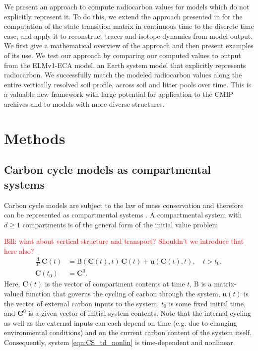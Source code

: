 \documentclass[11pt,a4paper]{article}
\newcommand{\red}[1]{\textcolor{red}{#1}}
\renewcommand{\vec}[1]{\mathbf{#1}}
\newcommand{\tens}[1]{\mathrm{#1}}
\newcommand{\deriv}[1]{\frac{\mathrm{d}}{\mathrm{d}#1}}
\begin{document}
We present an approach to compute radiocarbon values for models which do not explicitly represent it. To do this, we extend the approach presented in \citet{Metzler2018PNAS} for the computation of the state transition matrix in continuous time to the discrete time case, and apply it to reconstruct tracer and isotope dynamics from model output. We first give a mathematical overview of the approach and then present examples of its use. We test our approach by comparing our computed values to output from the ELMv1-ECA model, an Earth system model that explicitly represents radiocarbon. We successfully match the modeled radiocarbon values along the entire vertically resolved soil profile, across soil and litter pools over time. This is a valuable new framework with large potential for application to the CMIP archives and to models with more diverse structures. 

\section{Methods}
\subsection{Carbon cycle models as compartmental systems}
    Carbon cycle models are subject to the law of mass conservation and therefore can be represented as compartmental systems \citep{Anderson1983, Jacquez1993}.
    A compartmental system with $d\geq1$ compartments is of the general form of the initial value problem
    
    \red{Bill: what about vertical structure and transport? Shouldn't we introduce that here also?}
    \begin{equation}\label{eqn:CS_td_nonlin}
        \begin{aligned}
            \deriv{t}\,\vec{C}(t) &= \tens{B}(\vec{C}(t),t)\,\vec{C}(t) + \vec{u}(\vec{C}(t),t),\quad t>t_0,\\
            \vec{C}(t_0) &= \vec{C}^0.
        \end{aligned}
    \end{equation}
Here, $\vec{C}(t)$ is the vector of compartment contents at time $t$, $\tens{B}$ is a matrix-valued function that governs the cycling of carbon through the system, $\vec{u}(t)$ is the vector of external carbon inputs to the system, $t_0$ is some fixed initial time, and $\vec{C}^0$ is a given vector  of initial system contents. Note that the internal cycling as well as the external inputs can each depend on time (e.g. due to changing environmental conditions) and on the current carbon content of the system itself. Consequently, system \eqref{eqn:CS_td_nonlin} is time-dependent and nonlinear.
    
\end{document}

